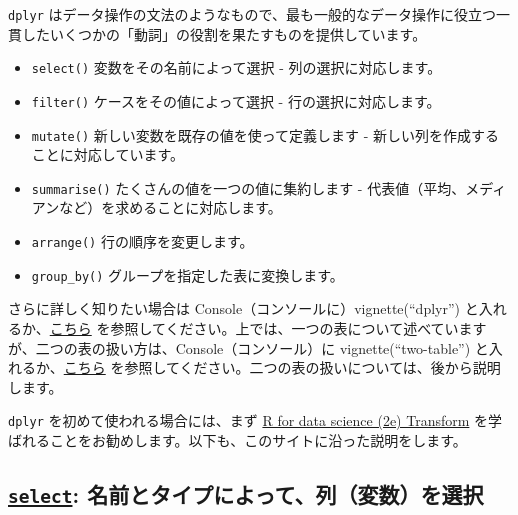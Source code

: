 \documentclass[
  xelatex, ja=standard]{bxjsbook}
\providecommand{\tightlist}{%
  \setlength{\itemsep}{0pt}\setlength{\parskip}{0pt}}
\theoremstyle{definition}
\theoremstyle{definition}
\theoremstyle{definition}
\theoremstyle{definition}
\theoremstyle{remark}
\begin{document}
\texttt{dplyr} はデータ操作の文法のようなもので、最も一般的なデータ操作に役立つ一貫したいくつかの「動詞」の役割を果たすものを提供しています。

\begin{itemize}
\tightlist
\item
  \texttt{select()} 変数をその名前によって選択 - 列の選択に対応します。
\item
  \texttt{filter()} ケースをその値によって選択 - 行の選択に対応します。
\item
  \texttt{mutate()} 新しい変数を既存の値を使って定義します - 新しい列を作成することに対応しています。
\item
  \texttt{summarise()} たくさんの値を一つの値に集約します - 代表値（平均、メディアンなど）を求めることに対応します。
\item
  \texttt{arrange()} 行の順序を変更します。
\item
  \texttt{group\_by()} グループを指定した表に変換します。
\end{itemize}

さらに詳しく知りたい場合は Console（コンソールに）vignette(``dplyr'') と入れるか、\href{https://cran.r-project.org/web/packages/dplyr/vignettes/dplyr.html}{こちら} を参照してください。上では、一つの表について述べていますが、二つの表の扱い方は、Console（コンソール）に vignette(``two-table'') と入れるか、\href{https://cran.r-project.org/web/packages/dplyr/vignettes/two-table.html}{こちら} を参照してください。二つの表の扱いについては、後から説明します。

\texttt{dplyr} を初めて使われる場合には、まず \href{https://r4ds.hadley.nz/transform}{R for data science (2e) Transform} を学ばれることをお勧めします。以下も、このサイトに沿った説明をします。

\hypertarget{select-ux540dux524dux3068ux30bfux30a4ux30d7ux306bux3088ux3063ux3066ux5217ux5909ux6570ux3092ux9078ux629e}{%
\subsection{\texorpdfstring{\href{https://dplyr.tidyverse.org/reference/select.html}{\texttt{select}}: 名前とタイプによって、列（変数）を選択}{select: 名前とタイプによって、列（変数）を選択}}\label{select-ux540dux524dux3068ux30bfux30a4ux30d7ux306bux3088ux3063ux3066ux5217ux5909ux6570ux3092ux9078ux629e}}
\end{document}
